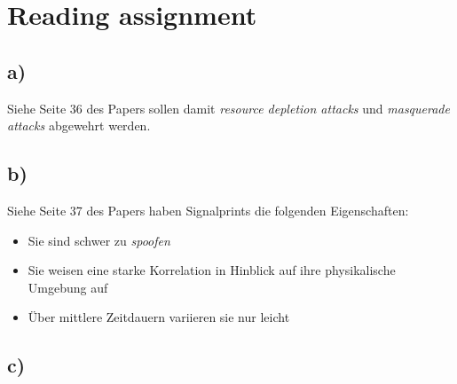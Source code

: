\documentclass[12pt,a4paper]{article}
\begin{document}
\begin{comment}
\begin{figure}[ht!]
\centering
	\texttt{[image: images\_files/Aufgabe-3d).png]}
	\caption{Vergleich}
	\label{fig:YourLabe7}
\end{figure}

\newpage



\end{comment}

\section{Reading assignment}

\subsection{a)} 
Siehe Seite 36 des Papers sollen damit \textit{resource 
depletion attacks} und \textit{masquerade attacks} 
abgewehrt werden.


\subsection{b)} 
Siehe Seite 37 des Papers haben Signalprints die folgenden 
Eigenschaften:

\begin{itemize}
	\item Sie sind schwer zu \textit{spoofen} 
	\item Sie weisen eine starke Korrelation in Hinblick auf ihre 
	physikalische Umgebung auf
	\item Über mittlere Zeitdauern variieren sie nur leicht 
\end{itemize}


\subsection{c)} 
\end{document}
